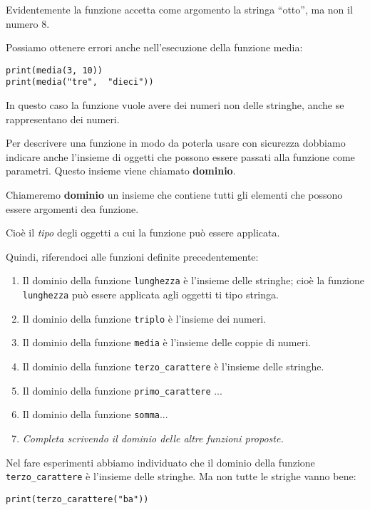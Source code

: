 Evidentemente la funzione accetta come argomento la stringa  ``otto'', ma 
non il numero 8.

Possiamo ottenere errori anche nell'esecuzione della funzione media:

\begin{lstlisting}
print(media(3, 10))
print(media("tre",  "dieci"))
\end{lstlisting}

In questo caso la funzione vuole avere dei numeri non delle stringhe, anche 
se rappresentano dei numeri.

Per descrivere una funzione in modo da poterla usare con sicurezza 
dobbiamo indicare anche l'insieme di oggetti che possono essere passati 
alla funzione come parametri. Questo insieme viene chiamato 
\textbf{dominio}.

\begin{definizione}
Chiameremo \textbf{dominio} un insieme che contiene tutti gli elementi che 
possono essere argomenti dea funzione.
\end{definizione}

Cioè il \emph{tipo} degli oggetti a cui la funzione può essere applicata.

Quindi, riferendoci alle funzioni definite precedentemente:

\begin{enumerate} [noitemsep]
\item Il dominio della funzione \texttt{lunghezza} è l'insieme delle 
stringhe; cioè la funzione \texttt{lunghezza} può essere applicata agli 
oggetti ti tipo stringa.
\item Il dominio della funzione \texttt{triplo} è l'insieme dei numeri.
\item Il dominio della funzione \texttt{media} è l'insieme delle coppie di 
numeri.
\item Il dominio della funzione \texttt{terzo\_carattere} è l'insieme delle 
stringhe.
\item Il dominio della funzione \texttt{primo\_carattere} ...
\item Il dominio della funzione \texttt{somma}...
\item \emph{Completa scrivendo il dominio delle altre funzioni proposte.}
\end{enumerate}

Nel fare esperimenti abbiamo individuato che il dominio della 
funzione \texttt{terzo\_carattere} è l'insieme delle stringhe. Ma non tutte 
le strighe vanno bene:

\begin{lstlisting}
print(terzo_carattere("ba"))
\end{lstlisting}

